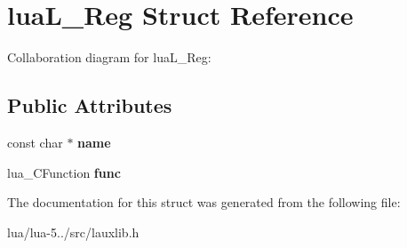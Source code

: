 \hypertarget{structlua_l___reg}{\section{lua\+L\+\_\+\+Reg Struct Reference}
\label{structlua_l___reg}
}


Collaboration diagram for lua\+L\+\_\+\+Reg\+:
\subsection*{Public Attributes}
\begin{DoxyCompactItemize}
\item 
\hypertarget{structlua_l___reg_a58b99f63b304e5c489b90d812f92cba2}{const char $\ast$ {\bfseries name}}\label{structlua_l___reg_a58b99f63b304e5c489b90d812f92cba2}

\item 
\hypertarget{structlua_l___reg_a54aa8f9955870caf78148514e61196ce}{lua\+\_\+\+C\+Function {\bfseries func}}\label{structlua_l___reg_a54aa8f9955870caf78148514e61196ce}

\end{DoxyCompactItemize}


The documentation for this struct was generated from the following file\+:\begin{DoxyCompactItemize}
\item 
lua/lua-\/5../src/lauxlib.\+h\end{DoxyCompactItemize}
